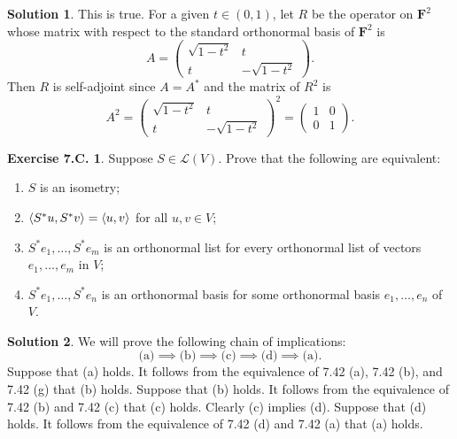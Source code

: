 \documentclass[12pt]{article}
\theoremstyle{definition}
\theoremstyle{exercise}
\newtheorem{exercise}{Exercise 7.C.}
\theoremstyle{solution}
\newtheorem*{solution}{Solution}
\newcommand{\lmap}{\mathcal{L}}
\newcommand{\F}{\mathbf{F}}
\DeclarePairedDelimiter\ip{\langle}{\rangle}
\begin{document}
\begin{solution}
    This is true. For a given \( t \in (0, 1) \), let \( R \) be the operator on \( \F^2 \) whose matrix with respect to the standard orthonormal basis of \( \F^2 \) is
    \[
        A = \begin{pmatrix}
            \sqrt{1 - t^2} & t \\
            t & -\sqrt{1 - t^2}
        \end{pmatrix}.
    \]
    Then \( R \) is self-adjoint since \( A = A^* \) and the matrix of \( R^2 \) is
    \[
        A^2 = \begin{pmatrix}
            \sqrt{1 - t^2} & t \\
            t & -\sqrt{1 - t^2}
        \end{pmatrix}^2
        =
        \begin{pmatrix}
            1 & 0 \\
            0 & 1
        \end{pmatrix}.
    \]
\end{solution}

\begin{exercise}
\label{ex:10}
    Suppose \( S \in \lmap(V) \). Prove that the following are equivalent:
    \begin{enumerate}
        \item \( S \) is an isometry;

        \item \( \ip{S^* u, S^* v} = \ip{u, v} \) for all \( u, v \in V \);

        \item \( S^* e_1, \ldots, S^* e_m \) is an orthonormal list for every orthonormal list of vectors \( e_1, \ldots, e_m \) in \( V \);

        \item \( S^* e_1, \ldots, S^* e_n \) is an orthonormal basis for some orthonormal basis \( e_1, \ldots, e_n \) of \( V \).
    \end{enumerate}
\end{exercise}

\begin{solution}
    We will prove the following chain of implications:
    \[
        \text{(a)} \implies \text{(b)} \implies \text{(c)} \implies \text{(d)} \implies \text{(a)}.
    \]
    Suppose that (a) holds. It follows from the equivalence of 7.42 (a), 7.42 (b), and 7.42 (g) that (b) holds. Suppose that (b) holds. It follows from the equivalence of 7.42 (b) and 7.42 (c) that (c) holds. Clearly (c) implies (d). Suppose that (d) holds. It follows from the equivalence of 7.42 (d) and 7.42 (a) that (a) holds.
\end{solution}
\end{document}
